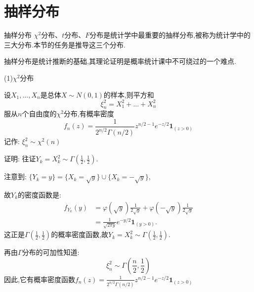 \section{抽样分布}
 \frame{\sectionpage}
	\begin{frame}{抽样分布}
		$\chi^2$分布、$t$分布、$F$分布是统计学中最重要的抽样分布,被称为统计学中的三大分布.本节的任务是推导这三个分布.
		
		抽样分布是统计推断的基础,其理论证明是概率统计课中不可绕过的一个难点.
		
		(1)$\chi^2$分布
		
		设$X_1,...,X_n$是总体$X\sim N(0,1)$的样本,则\alert{平方和
		\begin{equation}
			\xi_n^2 = X_1^2+...+X_n^2
		\end{equation}
		服从$n$个自由度的$\chi^2$分布},有概率密度
		\begin{equation}
			f_n(z) = \frac{1}{2^{n/2}\Gamma(n/2)}z^{n/2-1}e^{-z/2}\bm{1}_{(z>0)}
		\end{equation}
		记作: $\xi_n^2\sim \chi^2(n)$
	\end{frame}

	\begin{frame}
		证明: 往证$Y_k = X_k^2\sim \Gamma(\frac{1}{2},\frac{1}{2})$.
		
		注意到: $\{Y_k = y\} = \{X_k = \sqrt{y}\}\cup\{X_k = -\sqrt{y}\}$,

		故$Y_k$的密度函数是:
		\begin{equation}
			\begin{split}
				f_{Y_k}(y) &= \varphi(\sqrt{y})\frac{1}{2\sqrt{y}} + \varphi(-\sqrt{y})\frac{1}{2\sqrt{y}}\\
				&= \frac{1}{\sqrt{2\pi y}}e^{-y/2}\bm{1}_{(y>0)}.
			\end{split}
		\end{equation}
		这正是$\Gamma(\frac{1}{2},\frac{1}{2})$的概率密度函数,故$Y_k = X_k^2\sim \Gamma(\frac{1}{2},\frac{1}{2})$.
		
		再由$\Gamma$分布的可加性知道:
		\begin{equation}
			\xi_n^2 \sim \Gamma(\frac{n}{2},\frac{1}{2})
		\end{equation}
		因此,它有概率密度函数$f_n(z) = \frac{1}{2^{n/2}\Gamma(n/2)}z^{n/2-1}e^{-z/2}\bm{1}_{(z>0)}$
	\end{frame}

